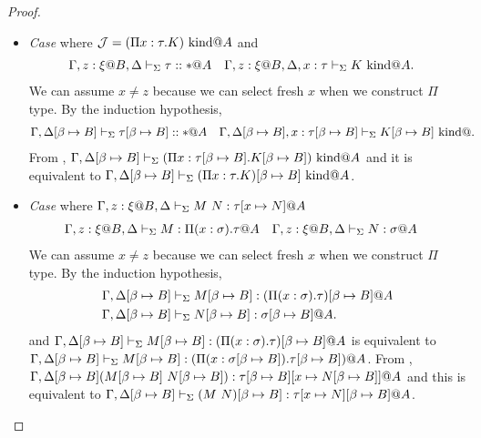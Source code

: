 \begin{proof}
\begin{itemize}
		\item[] \textit{Case} \WAbs{} where \( \mathcal{J} =  (\Pi x:\tau.K) \text{\ kind} @A\) and
		      \begin{align*}	      	      	      
		      	  & \G, z:\xi@B, \D \V \tau::*@A &   & \G, z:\xi@B, \D, x:\tau \V K \iskind@A. 
		      \end{align*}
		      We can assume $x \neq z$ because we can select fresh $x$ when we construct $\Pi$ type.
		      By the induction hypothesis,
		      \begin{align*}
		      	  & \G,\D\SB \V \tau\SB::*@A &   & \G,\D\SB, x:\tau\SB \V K\SB \iskind@. 
		      \end{align*}
		      From \WAbs, $\Gamma,\Delta[\beta \mapsto B] \vdash_\Sigma (\Pi x:\tau[\beta \mapsto B].K[\beta \mapsto B]) \text{\ kind} @A$ and 
		      it is equivalent to $\Gamma,\Delta[\beta \mapsto B] \vdash_\Sigma (\Pi x:\tau.K)[\beta \mapsto B] \text{\ kind} @A$.
		      \vspace{3mm}
		      
		\item[] \textit{Case} \TApp{} where \( \G, z:\xi@B, \D \V M\ N:\tau[x\mapsto N]@A \)
		      \begin{align*}
		      	  & \G, z:\xi@B, \D \V M:\Pi(x:\sigma).\tau@A &   & \G, z:\xi@B, \D \V N:\sigma@A 
		      \end{align*}
		      We can assume $x \neq z$ because we can select fresh $x$ when we construct $\Pi$ type.
		      By the induction hypothesis,
		      \begin{align*}
		      	  & \G, \D\SB \V M\SB: (\Pi(x:\sigma).\tau)\SB@A \\
		      	  & \G,\D\SB\V N\SB: \sigma\SB@A.                
		      \end{align*}
		      and \(\G, \D\SB \V M\SB: (\Pi(x:\sigma).\tau)\SB@A\) is equivalent to \( \Gamma, \Delta[\beta \mapsto B] \vdash_\Sigma M[\beta \mapsto B]: (\Pi(x:\sigma[\beta \mapsto B]).\tau[\beta \mapsto B])@A \).
		      From \TApp, \(\Gamma,\Delta[\beta \mapsto B] (M[\beta \mapsto B]\ N[\beta \mapsto B]): \tau[\beta \mapsto B][x \mapsto N[\beta \mapsto B]]@A\) and this is equivalent to
		      \(\G,\D\SB \V (M\ N)\SB: \tau[x \mapsto N]\SB@A\).
	\end{itemize}
\end{proof}

				
				
				
	      	      	      	      
	      	      	      	      
